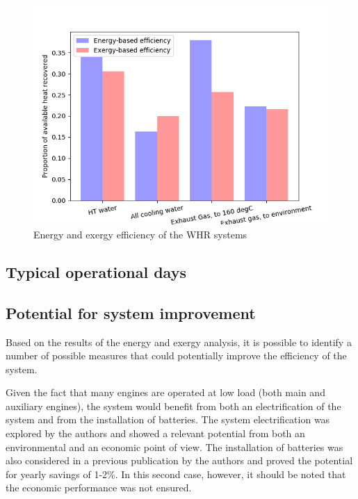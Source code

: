 \documentclass[preprint,12pt]{elsarticle}
\begin{document}
\begin{figure}
	\centering
	\includegraphics[width=0.99\linewidth]{Figures/Bar_WHRefficiency}
	\caption{Energy and exergy efficiency of the WHR systems}
	\label{fig:Bar_efficiencyWHR}
\end{figure}


\subsection{Typical operational days}  \label{sec:res:typicalDays}





\subsection{Potential for system improvement}

Based on the results of the energy and exergy analysis, it is possible to identify a number of possible measures that could potentially improve the efficiency of the system. 

Given the fact that many engines are operated at low load (both main and auxiliary engines), the system would benefit from both an electrification of the system and from the installation of batteries. The system electrification was explored by the authors \cite{Baldi2016b} and showed a relevant potential from both an environmental and an economic point of view. The installation of batteries was also considered in a previous publication by the authors \cite{Baldi2017} and proved the potential for yearly savings of 1-2\%. In this second case, however, it should be noted that the economic performance was not ensured. 
\end{document}
